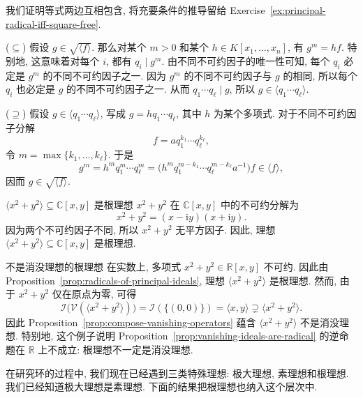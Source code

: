 \begin{Proof}
  我们证明等式两边互相包含, 将充要条件的推导留给 Exercise~\ref{ex:principal-radical-iff-square-free}.

  ($\subseteq$) 假设 $g\in\sqrt{\langle f\rangle}$. 那么对某个 $m>0$ 和某个 $h\in K[x_{1},\ldots,x_{n}]$, 有 $g^{m}=hf$. 特别地, 这意味着对每个 $i$, 都有 $q_{i}\mid g^{m}$. 由不同不可约因子的唯一性可知, 每个 $q_{i}$ 必定是 $g^{m}$ 的不同不可约因子之一. 因为 $g^{m}$ 的不同不可约因子与 $g$ 的相同, 所以每个 $q_{i}$ 也必定是 $g$ 的不同不可约因子之一. 从而 $q_{1}\cdots q_{\ell}\mid g$, 所以 $g\in\langle q_{1}\cdots q_{\ell}\rangle$.

  ($\supseteq$) 假设 $g\in\langle q_{1}\cdots q_{\ell}\rangle$, 写成 $g=hq_{1}\cdots q_{\ell}$, 其中 $h$ 为某个多项式. 对于不同不可约因子分解
  \[
    f=aq_{1}^{k_{1}}\cdots q_{\ell}^{k_{\ell}},
  \]
  令 $m=\max\{k_{1},\ldots,k_{\ell}\}$. 于是
  \[
    g^{m}=h^{m}q_{1}^{m}\cdots q_{\ell}^{m}
      =\bigl(h^{m}q_{1}^{m-k_{1}}\cdots q_{\ell}^{m-k_{\ell}}a^{-1}\bigr)f
      \in\langle f\rangle,
  \]
  因而 $g\in\sqrt{\langle f\rangle}$.
\end{Proof}

\begin{Example}{{\textmd{$\langle x^{2}+y^{2}\rangle\subseteq\mathbb{C}[x,y]$} 是根理想}}\leavevmode\label{ex:sum-of-squares-complex-radical}
  $x^{2}+y^{2}$ 在 $\mathbb{C}[x,y]$ 中的不可约分解为
  \[
    x^{2}+y^{2}=(x-\mathrm{i}y)(x+\mathrm{i}y).
  \]
  因为两个不可约因子不同, 所以 $x^{2}+y^{2}$ 无平方因子. 因此, 理想 $\langle x^{2}+y^{2}\rangle\subseteq\mathbb{C}[x,y]$ 是根理想.
\end{Example}

\begin{Example}{不是消没理想的根理想}\leavevmode\label{ex:real-radical-not-vanishing}
  在实数上, 多项式 $x^{2}+y^{2}\in\mathbb{R}[x,y]$ 不可约. 因此由 Proposition~\ref{prop:radicals-of-principal-ideals}, 理想 $\langle x^{2}+y^{2}\rangle$ 是根理想. 然而, 由于 $x^{2}+y^{2}$ 仅在原点为零, 可得
  \[
    \mathcal{I}\bigl(\mathcal{V}(\langle x^{2}+y^{2}\rangle)\bigr)
     =\mathcal{I}(\{(0,0)\})=\langle x,y\rangle\supsetneq\langle x^{2}+y^{2}\rangle.
  \]
  因此 Proposition~\ref{prop:compose-vanishing-operators} 蕴含 $\langle x^{2}+y^{2}\rangle$ 不是消没理想. 特别地, 这个例子说明 Proposition~\ref{prop:vanishing-ideals-are-radical} 的逆命题在 $\mathbb{R}$ 上不成立: 根理想不一定是消没理想.
\end{Example}

在研究环的过程中, 我们现在已经遇到三类特殊理想: 极大理想, 素理想和根理想. 我们已经知道极大理想是素理想. 下面的结果把根理想也纳入这个层次中.

